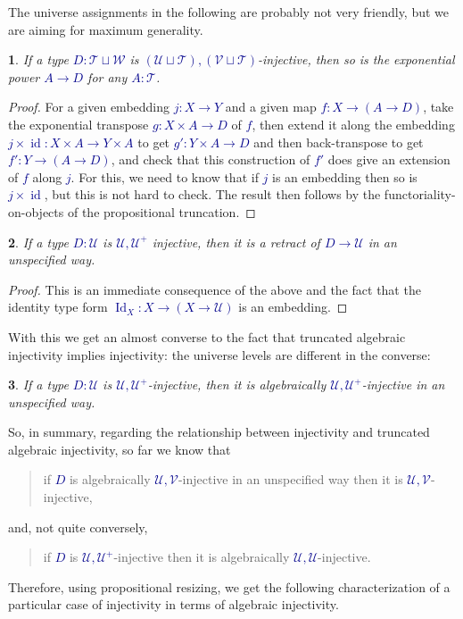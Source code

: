 \documentclass[10pt]{article}
\newcommand{\db}{\textcolor{darkblue}}
\newcommand{\m}[1]{\db{$#1$}}
\newcommand{\id}{\operatorname{id}}
\newcommand{\U}{\mathcal{U}}
\newcommand{\V}{\mathcal{V}}
\newcommand{\W}{\mathcal{W}}
\newcommand{\T}{\mathcal{T}}
\newcommand{\Id}{\operatorname{Id}}
\newtheorem{numbered}{}
\theoremstyle{definition}
\begin{document}
The universe assignments in the following are probably not very
friendly, but we are aiming for maximum generality.
\begin{numbered}
 If a type \m{D : \T \sqcup \W} is \m{(\U \sqcup \T),(\V \sqcup \T)}-injective, then so is the exponential power \m{A \to D} for any \m{A:\T}.
\end{numbered}
\begin{proof}
  For a given embedding \m{j : X \to Y} and a given map \m{f : X \to
    (A \to D)}, take the exponential transpose \m{g : X \times A \to
    D} of \m{f}, then extend it along the embedding \m{j \times \id :
    X \times A \to Y \times A} to get \m{g' : Y \times A \to D} and
  then back-transpose to get \m{f' : Y \to (A \to D)}, and check that
  this construction of \m{f'} does give an extension of \m{f} along
  \m{j}. For this, we need to know that if \m{j} is an embedding then
  so is \m{j \times \id}, but this is not hard to check. The result
  then follows by the functoriality-on-objects of the propositional
  truncation.
\end{proof}


\begin{numbered}
  If a type \m{D:\U} is \m{\U,\U^+} injective, then it is a retract of
  \m{D \to \U} in an unspecified way.
\end{numbered}
\begin{proof}
  This is an immediate consequence of the above and the fact that the
  identity type form \m{\Id_X : X \to (X \to \U)} is an embedding.
\end{proof}

With this we get an almost converse to the fact that truncated
algebraic injectivity implies injectivity: the universe levels are
different in the converse:

\begin{numbered}
  If a type \m{D:\U} is \m{\U,\U^+}-injective, then it is algebraically \m{\U,\U^+}-injective in an unspecified way.
\end{numbered}

So, in summary, regarding the relationship between injectivity and
truncated algebraic injectivity, so far we know that
\begin{quote}
  if \m{D} is algebraically \m{\U,\V}-injective in an unspecified way
  then it is \m{\U,\V}-injective,
\end{quote}
and, not quite conversely,
\begin{quote}
  if \m{D} is \m{\U,\U^+}-injective then it is algebraically \m{\U,\U}-injective.
\end{quote}
Therefore, using propositional resizing, we get the following
characterization of a particular case of injectivity in terms of
algebraic injectivity.
\end{document}
